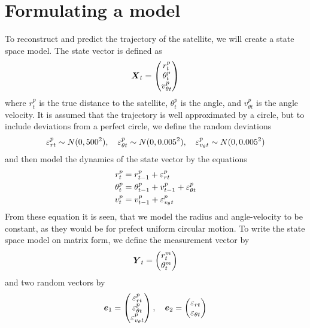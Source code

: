 \section*{Formulating a model}
To reconstruct and predict the trajectory of the satellite, we will create a state space model. The state vector is defined as
\begin{equation*}
    \boldsymbol{X}_t = \begin{pmatrix}
        r^p_t \\
        \theta^p_t \\
        v^p_{\theta t}
    \end{pmatrix}
\end{equation*}
where $r^p_{t}$ is the true distance to the satellite, $\theta^p_t$ is the angle, and $v^p_{\theta t}$ is the angle velocity. It is assumed that the trajectory is well approximated by a circle, but to include deviations from a perfect circle, we define the random deviations
\begin{equation*}
    \varepsilon^p_{rt} \sim N(0,500^2), \quad \varepsilon^p_{\theta t}\sim N(0,0.005^2), \quad \varepsilon^p_{v_\theta t} \sim N(0, 0.005^2)
\end{equation*}
and then model the dynamics of the state vector by the equations
\begin{align*}
    r^p_t &= r^p_{t-1} + \varepsilon^p_{rt} \\
    \theta^p_t &= \theta^p_{t-1} + v^p_{t-1} + \varepsilon^p_{\theta t} \\
    v^p_t &= v^p_{t-1} + \varepsilon^p_{v_\theta t}
\end{align*}
From these equation it is seen, that we model the radius and angle-velocity to be constant, as they would be for prefect uniform circular motion.
To write the state space model on matrix form, we define the measurement vector by
\begin{equation*}
    \boldsymbol{Y}_t = \begin{pmatrix}
        r^m_t \\
        \theta^m_t
    \end{pmatrix}
\end{equation*}
and two random vectors by
\begin{equation*}
    \boldsymbol{e}_1 = \begin{pmatrix}
        \varepsilon^p_{rt} \\
        \varepsilon^p_{\theta t} \\
        \varepsilon^p_{v_\theta t}
    \end{pmatrix}, \quad \boldsymbol{e}_2 = \begin{pmatrix}
        \varepsilon_{rt} \\
        \varepsilon_{\theta t}
    \end{pmatrix}
\end{equation*}
